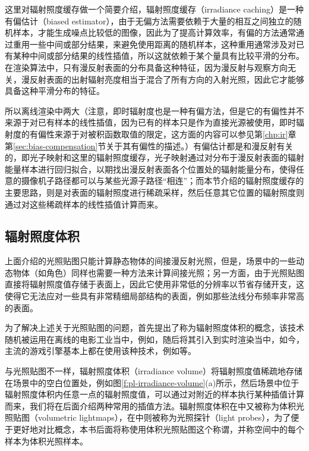 \begin{myshaded}
	这里对辐射照度缓存做一个简要介绍，辐射照度缓存（irradiance caching）是一种有偏估计（biased estimator），由于无偏方法需要依赖于大量的相互之间独立的随机样本，才能生成噪点比较低的图像，因此为了提高计算效率，有偏的方法通常通过重用一些中间或部分结果，来避免使用距离的随机样本，这种重用通常涉及对已有某种中间或部分结果的线性插值，所以这就依赖于某个量具有比较平滑的分布。在渲染算法中，只有漫反射表面的分布具备这种特征，因为漫反射与观察方向无关，漫反射表面的出射辐射亮度相当于混合了所有方向的入射光照，因此它才能够具备这种平滑分布的特征。

	所以离线渲染中两大（注意，即时辐射度也是一种有偏方法，但是它的有偏性并不来源于对已有样本的线性插值，因为已有的样本只是作为直接光源被使用，即时辐射度的有偏性来源于对被积函数取值的限定，这方面的内容可以参见第\ref{chp:ir}章第\ref{sec:bias-compensation}节关于其有偏性的描述。）有偏估计都是和漫反射有关的，即光子映射和这里的辐射照度缓存，光子映射通过对分布于漫反射表面的辐射能量样本进行回归拟合，以期找出漫反射表面各个位置处的辐射能量分布，使得任意的摄像机子路径都可以与某些光源子路径“相连”；而本节介绍的辐射照度缓存的主要思路，则是对表面的辐射照度进行稀疏采样，然后任意其它位置的辐射照度则通过对这些稀疏样本的线性插值计算而来。
\end{myshaded}





\subsection{辐射照度体积}\label{sec:pl-irradiance-volume}
上面介绍的光照贴图只能计算静态物体的间接漫反射光照，但是，场景中的一些动态物体（如角色）同样也需要一种方法来计算间接光照；另一方面，由于光照贴图直接将辐射照度值存储于表面上，因此它使用非常低的分辨率以节省存储开支，这使得它无法应对一些具有非常精细局部结构的表面，例如那些法线分布频率非常高的表面。

为了解决上述关于光照贴图的问题，\cite{a:TheIrradianceVolume}首先提出了称为辐射照度体积的概念，该技术随机被运用在离线的电影工业当中，例如\cite{a:RenderinginCars2}，随后\cite{a:IrradianceVolumesforGames}将其引入到实时渲染当中，如今，主流的游戏引擎基本上都在使用该种技术，例如\cite{a:VolumetricGlobalIlluminationAtTreyarch,m:VolumetricLightmaps,m:LightProbes}等。

与光照贴图不一样，辐射照度体积（irradiance volume）将辐射照度值稀疏地存储在场景中的空白位置处，例如图\ref{f:pl-irradiance-volume}(a)所示，然后场景中位于辐射照度体积内任意一点的辐射照度值，可以通过对附近的样本执行某种插值计算而来，我们将在后面介绍两种常用的插值方法。辐射照度体积在\cite{m:VolumetricLightmaps}中又被称为体积光照贴图（volumetric lightmaps），在\cite{m:LightProbes}中则被称为光照探针（light probes），为了便于更好地对比概念，本书后面将称使用体积光照贴图这个称谓，并称空间中的每个样本为体积光照样本。

